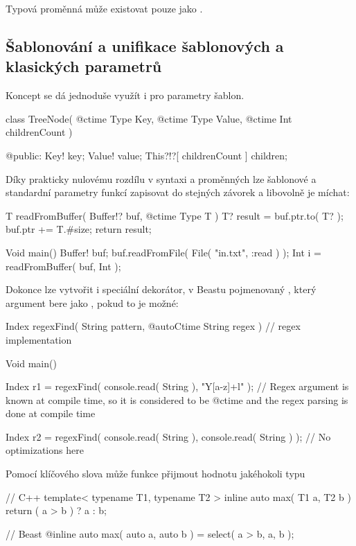 Typová proměnná může existovat pouze jako \ctime.

\subsection{Šablonování a unifikace šablonových a klasických parametrů}
Koncept \ctime se dá jednoduše využít i pro parametry šablon.

\begin{code}
class TreeNode( @ctime Type Key, @ctime Type Value, @ctime Int childrenCount ) {
	
@public:
	Key! key;
	Value! value;
	This?!?[ childrenCount ] children;
	
}
\end{code}

Díky prakticky nulovému rozdílu v syntaxi \ctime a \nonctime proměnných lze šablonové a standardní parametry funkcí zapisovat do stejných závorek a libovolně je míchat:
\begin{code}
T readFromBuffer( Buffer!? buf, @ctime Type T ) {
	T? result = buf.ptr.to( T? );
	buf.ptr += T.#size;
	return result;
}

Void main() {
	Buffer! buf;
	buf.readFromFile( File( "in.txt", :read ) ); 
	Int i = readFromBuffer( buf, Int );
}
\end{code}

Dokonce lze vytvořit i speciální dekorátor, v Beastu pojmenovaný , který argument bere jako \ctime, pokud to je možné:
\begin{code}
Index regexFind( String pattern, @autoCtime String regex ) {
	// regex implementation
}

Void main() {
	Index r1 = regexFind( console.read( String ), "Y[a-z]+l" ); // Regex argument is known at compile time, so it is considered to be @ctime and the regex parsing is done at compile time
	
	Index r2 = regexFind( console.read( String ), console.read( String ) ); // No optimizations here
}
\end{code}

Pomocí klíčového slova  může funkce přijmout hodnotu jakéhokoli typu
\begin{cppcode}
// C++
template< typename T1, typename T2 >
inline auto max( T1 a, T2 b ) {
	return ( a  > b ) ? a : b;
}
\end{cppcode}

\begin{code}
// Beast
@inline auto max( auto a, auto b ) = select( a > b, a, b );
\end{code}

